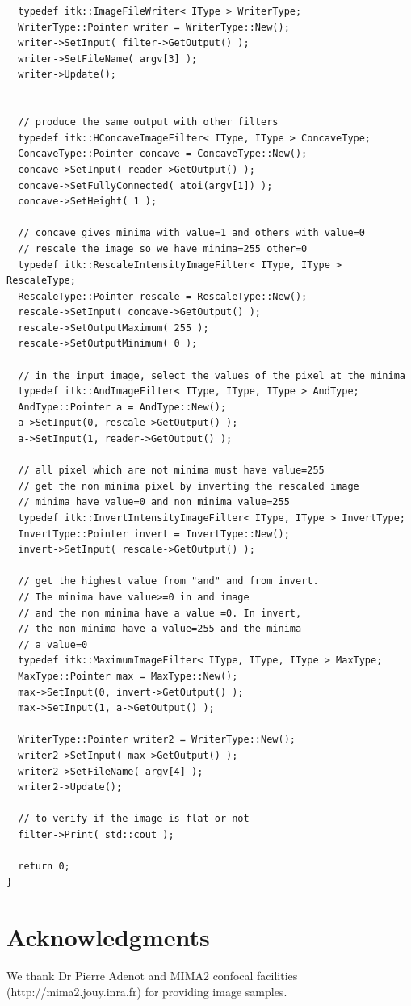 \documentclass{InsightArticle}
\begin{document}
\begin{verbatim}
  typedef itk::ImageFileWriter< IType > WriterType;
  WriterType::Pointer writer = WriterType::New();
  writer->SetInput( filter->GetOutput() );
  writer->SetFileName( argv[3] );
  writer->Update();


  // produce the same output with other filters
  typedef itk::HConcaveImageFilter< IType, IType > ConcaveType;
  ConcaveType::Pointer concave = ConcaveType::New();
  concave->SetInput( reader->GetOutput() );
  concave->SetFullyConnected( atoi(argv[1]) );
  concave->SetHeight( 1 );

  // concave gives minima with value=1 and others with value=0
  // rescale the image so we have minima=255 other=0
  typedef itk::RescaleIntensityImageFilter< IType, IType > RescaleType;
  RescaleType::Pointer rescale = RescaleType::New();
  rescale->SetInput( concave->GetOutput() );
  rescale->SetOutputMaximum( 255 );
  rescale->SetOutputMinimum( 0 );

  // in the input image, select the values of the pixel at the minima
  typedef itk::AndImageFilter< IType, IType, IType > AndType;
  AndType::Pointer a = AndType::New();
  a->SetInput(0, rescale->GetOutput() );
  a->SetInput(1, reader->GetOutput() );

  // all pixel which are not minima must have value=255
  // get the non minima pixel by inverting the rescaled image
  // minima have value=0 and non minima value=255
  typedef itk::InvertIntensityImageFilter< IType, IType > InvertType;
  InvertType::Pointer invert = InvertType::New();
  invert->SetInput( rescale->GetOutput() );

  // get the highest value from "and" and from invert. 
  // The minima have value>=0 in and image
  // and the non minima have a value =0. In invert, 
  // the non minima have a value=255 and the minima
  // a value=0
  typedef itk::MaximumImageFilter< IType, IType, IType > MaxType;
  MaxType::Pointer max = MaxType::New();
  max->SetInput(0, invert->GetOutput() );
  max->SetInput(1, a->GetOutput() );

  WriterType::Pointer writer2 = WriterType::New();
  writer2->SetInput( max->GetOutput() );
  writer2->SetFileName( argv[4] );
  writer2->Update();

  // to verify if the image is flat or not
  filter->Print( std::cout );

  return 0;
}
\end{verbatim} \normalsize

\section{Acknowledgments}
We thank Dr Pierre Adenot and MIMA2 confocal facilities (http://mima2.jouy.inra.fr)
for providing image samples.



\end{document}
